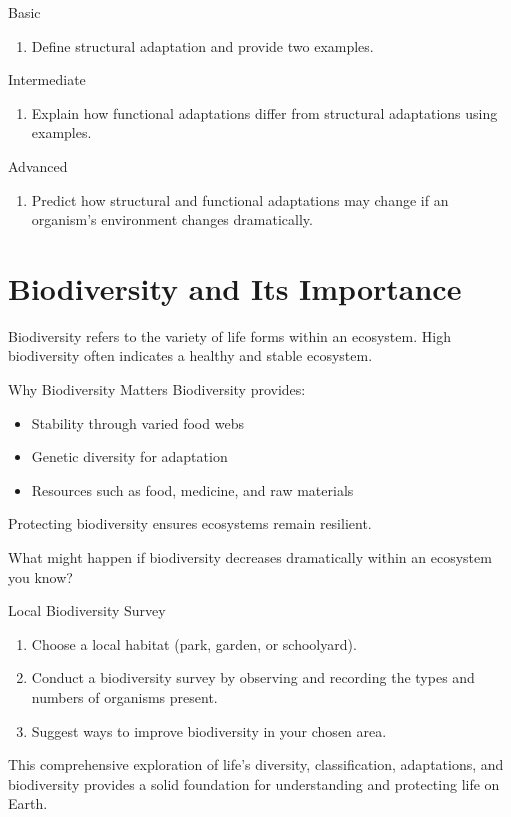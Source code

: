 \begin{tieredquestions}{Basic}
\begin{enumerate}
    \item Define structural adaptation and provide two examples.
\end{enumerate}
\end{tieredquestions}

\begin{tieredquestions}{Intermediate}
\begin{enumerate}
    \item Explain how functional adaptations differ from structural adaptations using examples.
\end{enumerate}
\end{tieredquestions}

\begin{tieredquestions}{Advanced}
\begin{enumerate}
    \item Predict how structural and functional adaptations may change if an organism's environment changes dramatically.
\end{enumerate}
\end{tieredquestions}

\section{Biodiversity and Its Importance}

Biodiversity refers to the variety of life forms within an ecosystem. High biodiversity often indicates a healthy and stable ecosystem.

\begin{keyconcept}{Why Biodiversity Matters}
Biodiversity provides:
\begin{itemize}
    \item Stability through varied food webs
    \item Genetic diversity for adaptation
    \item Resources such as food, medicine, and raw materials
\end{itemize}
Protecting biodiversity ensures ecosystems remain resilient.
\end{keyconcept}

\begin{stopandthink}
What might happen if biodiversity decreases dramatically within an ecosystem you know?
\end{stopandthink}

\begin{investigation}{Local Biodiversity Survey}
\begin{enumerate}
    \item Choose a local habitat (park, garden, or schoolyard).
    \item Conduct a biodiversity survey by observing and recording the types and numbers of organisms present.
    \item Suggest ways to improve biodiversity in your chosen area.
\end{enumerate}
\end{investigation}

This comprehensive exploration of life's diversity, classification, adaptations, and biodiversity provides a solid foundation for understanding and protecting life on Earth.